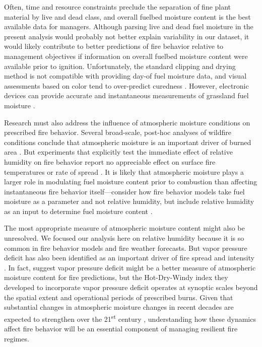 \documentclass[referee, 
		     sn-basic]{sn-jnl}
\begin{document}
\begin{linenumbers}
Often, time and resource constraints preclude the separation of fine
plant material by live and dead class, and overall fuelbed moisture
content is the best available data for managers. Although parsing live
and dead fuel moisture in the present analysis would probably not better
explain variability in our dataset, it would likely contribute to better
predictions of fire behavior relative to management objectives if
information on overall fuelbed moisture content were available prior to
ignition. Unfortunately, the standard clipping and drying method is not
compatible with providing day-of fuel moisture data, and visual
assessments based on color tend to over-predict curedness
\citep{kidnie2015a}. However, electronic devices can provide accurate
and instantaneous measurements of grassland fuel moisture
\citep{mcgranahan2019}.

Research must also address the influence of atmospheric moisture
conditions on prescribed fire behavior. Several broad-scale, post-hoc 
analyses of wildfire conditions conclude that atmospheric moisture is an
important driver of burned area \citep{evett2008, reid2010, sedano2014}.
But experiments that explicitly test the immediate effect of relative
humidity on fire behavior report no appreciable effect on surface fire
temperatures or rate of spread \citep{sparling1966, trollope1985}. It is
likely that atmospheric moisture plays a larger role in modulating fuel
moisture content prior to combustion than affecting instantaneous fire
behavior itself---consider how fire behavior models take fuel moisture
as a parameter and not relative humidity, but include relative humidity
as an input to determine fuel moisture content
\citep{rothermel1983, cruz2016}.

The most appropriate measure of atmospheric moisture content might also
be unresolved. We focused our analysis here on relative humidity because
it is so common in fire behavior models and fire weather forecasts. But
vapor pressure deficit has also been identified as an important driver
of fire spread and intensity \citep{gomes2020}. In fact,
\citet{srock2018} suggest vapor pressure deficit might be a better
measure of atmospheric moisture content for fire predictions, but the
Hot-Dry-Windy index they developed to incorporate vapor pressure deficit
operates at synoptic scales beyond the spatial extent and operational
periods of prescribed burns. Given that substantial changes in
atmospheric moisture changes in recent decades are expected to
strengthen over the 21\textsuperscript{st} century
\citep{seager2015, ficklin2017}, understanding how these dynamics affect
fire behavior will be an essential component of managing resilient fire
regimes.


\end{linenumbers}
\end{document}
